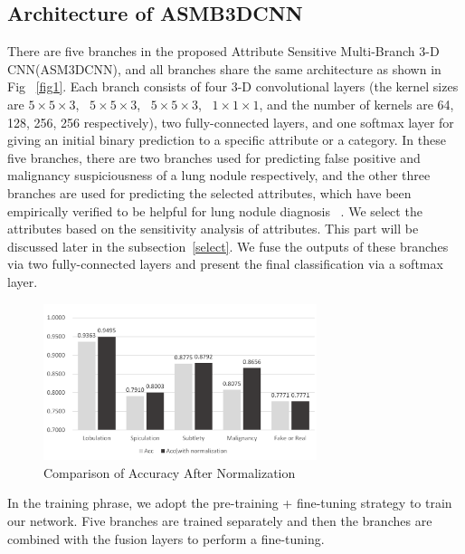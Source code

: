 \documentclass{article}
\begin{document}
\subsection{Architecture of ASMB3DCNN}
\vspace{-0.1cm}
There are five branches in the proposed Attribute Sensitive Multi-Branch 3-D CNN(ASM3DCNN), and all branches share the same architecture as shown in Fig ~\ref{fig1}. Each branch consists of four 3-D convolutional layers (the kernel sizes are $5\times5\times3$, ~$5\times5\times3$, ~$5\times5\times3$, ~$1\times1\times1$, and the number of kernels are 64, 128, 256, 256 respectively), two fully-connected layers, and one softmax layer for giving an initial binary prediction to a specific attribute or a category. In these five branches, there are two branches used for predicting false positive and malignancy suspiciousness of a lung nodule respectively, and the other three branches are used for predicting the selected attributes, which have been empirically verified to be helpful for lung nodule diagnosis~ \cite{Hussein2017Risk}. We select the attributes based on the sensitivity analysis of attributes. This part will be discussed later in the subsection~\ref{select}. We fuse the outputs of these branches via two fully-connected layers and present the final classification via a softmax layer.
\begin{figure}[*t]
\setlength{\abovecaptionskip}{0.cm}
\setlength{\belowcaptionskip}{-0.cm}
\centerline{\includegraphics[width=80mm]{fig2.pdf}}
\vspace{-0.5cm}
\caption{Comparison of Accuracy After Normalization}
\label{normalization}
\end{figure}

In the training phrase, we adopt the pre-training + fine-tuning strategy to train our network. Five branches are trained separately and then the branches are combined with the fusion layers to perform a fine-tuning.
\end{document}
